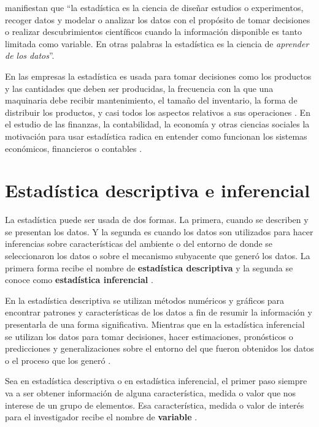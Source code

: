 \documentclass[letterpaper,]{book}
\begin{document}
\citet{lyman2010} manifiestan que ``la estadística es la ciencia de diseñar estudios o experimentos, recoger datos y modelar o analizar los datos con el propósito de tomar decisiones o realizar descubrimientos científicos cuando la información disponible es tanto limitada como variable. En otras palabras la estadística es la ciencia de \emph{aprender de los datos}''.

En las empresas la estadística es usada para tomar decisiones como los productos y las cantidades que deben ser producidas, la frecuencia con la que una maquinaria debe recibir mantenimiento, el tamaño del inventario, la forma de distribuir los productos, y casi todos los aspectos relativos a sus operaciones \citep{barrow2006}. En el estudio de las finanzas, la contabilidad, la economía y otras ciencias sociales la motivación para usar estadística radica en entender como funcionan los sistemas económicos, financieros o contables \citep{berenson2012}.

\hypertarget{estypes}{%
\section{Estadística descriptiva e inferencial}\label{estypes}}

La estadística puede ser usada de dos formas. La primera, cuando se describen y se presentan los datos. Y la segunda es cuando los datos son utilizados para hacer inferencias sobre características del ambiente o del entorno de donde se seleccionaron los datos o sobre el mecanismo subyacente que generó los datos. La primera forma recibe el nombre de \textbf{estadística descriptiva} y la segunda se conoce como \textbf{estadística inferencial} \citep{rossman2018}.

En la estadística descriptiva se utilizan métodos numéricos y gráficos para encontrar patrones y características de los datos a fin de resumir la información y presentarla de una forma significativa. Mientras que en la estadística inferencial se utilizan los datos para tomar decisiones, hacer estimaciones, pronósticos o predicciones y generalizaciones sobre el entorno del que fueron obtenidos los datos o el proceso que los generó \citep{cleff2013}.

Sea en estadística descriptiva o en estadística inferencial, el primer paso siempre va a ser obtener información de alguna característica, medida o valor que nos interese de un grupo de elementos. Esa característica, medida o valor de interés para el investigador recibe el nombre de \textbf{variable} \citep{keller2011}.
\end{document}
